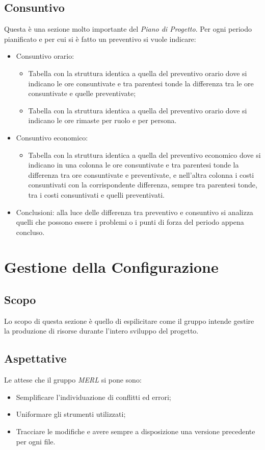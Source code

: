 \subsection{Consuntivo}
Questa è una sezione molto importante del \textit{Piano di Progetto}.
Per ogni periodo pianificato e per cui si è fatto un preventivo si vuole indicare:
\begin{itemize}
    \item Consuntivo orario:
        \begin{itemize}
            \item Tabella con la struttura identica a quella del preventivo orario dove si indicano le ore consuntivate e tra parentesi tonde la differenza tra le ore consuntivate e quelle preventivate;
            \item Tabella con la struttura identica a quella del preventivo orario dove si indicano le ore rimaste per ruolo e per persona.
        \end{itemize}
    \item Consuntivo economico:
        \begin{itemize}
            \item Tabella con la struttura identica a quella del preventivo economico dove si indicano in una colonna le ore consuntivate e tra parentesi tonde la differenza tra ore consuntivate e preventivate, e nell'altra colonna i costi consuntivati con la corrispondente differenza, sempre tra parentesi tonde, tra i costi consuntivati e quelli preventivati.
        \end{itemize}
    \item Conclusioni: alla luce delle differenza tra preventivo e consuntivo si analizza quelli che possono essere i problemi o i punti di forza del periodo appena concluso.
\end{itemize}


\section{Gestione della Configurazione}
\subsection{Scopo}
    Lo scopo di questa sezione è quello di espilicitare come il gruppo intende gestire la produzione di
    risorse durante l'intero sviluppo del progetto.
 \subsection{Aspettative}
    Le attese che il gruppo \textit{MERL} si pone sono:
    \begin{itemize}
        \item Semplificare l'individuazione di conflitti ed errori;
        \item Uniformare gli strumenti utilizzati;
        \item Tracciare le modifiche e avere sempre a disposizione una versione precedente per ogni file.
    \end{itemize}
